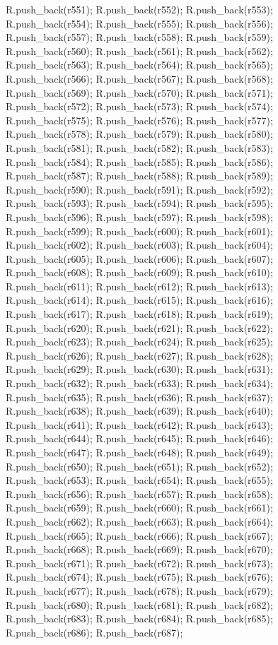 \begin{DoxyCode}
{R.push_back(r551);
R.push_back(r552);
R.push_back(r553);
R.push_back(r554);
R.push_back(r555);
R.push_back(r556);
R.push_back(r557);
R.push_back(r558);
R.push_back(r559);
R.push_back(r560);
R.push_back(r561);
R.push_back(r562);
R.push_back(r563);
R.push_back(r564);
R.push_back(r565);
R.push_back(r566);
R.push_back(r567);
R.push_back(r568);
R.push_back(r569);
R.push_back(r570);
R.push_back(r571);
R.push_back(r572);
R.push_back(r573);
R.push_back(r574);
R.push_back(r575);
R.push_back(r576);
R.push_back(r577);
R.push_back(r578);
R.push_back(r579);
R.push_back(r580);
R.push_back(r581);
R.push_back(r582);
R.push_back(r583);
R.push_back(r584);
R.push_back(r585);
R.push_back(r586);
R.push_back(r587);
R.push_back(r588);
R.push_back(r589);
R.push_back(r590);
R.push_back(r591);
R.push_back(r592);
R.push_back(r593);
R.push_back(r594);
R.push_back(r595);
R.push_back(r596);
R.push_back(r597);
R.push_back(r598);
R.push_back(r599);
R.push_back(r600);
R.push_back(r601);
R.push_back(r602);
R.push_back(r603);
R.push_back(r604);
R.push_back(r605);
R.push_back(r606);
R.push_back(r607);
R.push_back(r608);
R.push_back(r609);
R.push_back(r610);
R.push_back(r611);
R.push_back(r612);
R.push_back(r613);
R.push_back(r614);
R.push_back(r615);
R.push_back(r616);
R.push_back(r617);
R.push_back(r618);
R.push_back(r619);
R.push_back(r620);
R.push_back(r621);
R.push_back(r622);
R.push_back(r623);
R.push_back(r624);
R.push_back(r625);
R.push_back(r626);
R.push_back(r627);
R.push_back(r628);
R.push_back(r629);
R.push_back(r630);
R.push_back(r631);
R.push_back(r632);
R.push_back(r633);
R.push_back(r634);
R.push_back(r635);
R.push_back(r636);
R.push_back(r637);
R.push_back(r638);
R.push_back(r639);
R.push_back(r640);
R.push_back(r641);
R.push_back(r642);
R.push_back(r643);
R.push_back(r644);
R.push_back(r645);
R.push_back(r646);
R.push_back(r647);
R.push_back(r648);
R.push_back(r649);
R.push_back(r650);
R.push_back(r651);
R.push_back(r652);
R.push_back(r653);
R.push_back(r654);
R.push_back(r655);
R.push_back(r656);
R.push_back(r657);
R.push_back(r658);
R.push_back(r659);
R.push_back(r660);
R.push_back(r661);
R.push_back(r662);
R.push_back(r663);
R.push_back(r664);
R.push_back(r665);
R.push_back(r666);
R.push_back(r667);
R.push_back(r668);
R.push_back(r669);
R.push_back(r670);
R.push_back(r671);
R.push_back(r672);
R.push_back(r673);
R.push_back(r674);
R.push_back(r675);
R.push_back(r676);
R.push_back(r677);
R.push_back(r678);
R.push_back(r679);
R.push_back(r680);
R.push_back(r681);
R.push_back(r682);
R.push_back(r683);
R.push_back(r684);
R.push_back(r685);
R.push_back(r686);
R.push_back(r687);
}
\end{DoxyCode}
